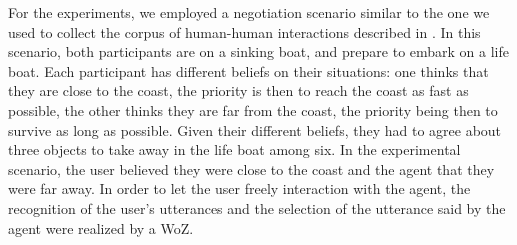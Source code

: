 For the experiments, we employed a negotiation scenario similar to the one we used to collect the corpus of human-human interactions described in \cite{jegou_continuous_2015}. In this scenario, both participants are on a sinking boat, and prepare to embark on a life boat. Each participant has different beliefs on their situations: one thinks that they are close to the coast, the priority is then to reach the coast as fast as possible, the other thinks they are far from the coast, the priority being then to survive as long as possible. Given their different beliefs, they had to agree about three objects to take away in the life boat among six. 
In the experimental scenario, the user believed they were close to the coast and the agent that they were far away. 
In order to let the user freely interaction with the agent, the recognition of the user's utterances and the selection of the utterance said by the agent were realized by a WoZ. %

